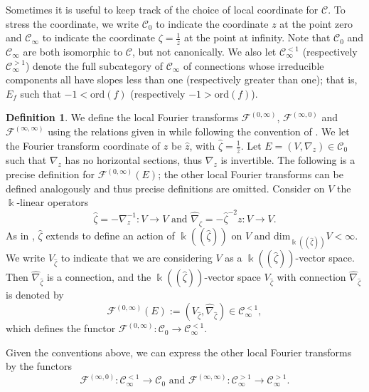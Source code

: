 \documentclass[11pt]{amsart}
\theoremstyle{plain}
\theoremstyle{definition}
\newtheorem{definition}[theorem]{Definition}
\theoremstyle{remark}
\def\z{\hat{\zeta}}
\begin{document}
 Sometimes it is useful to keep track of the choice of local coordinate for $\mathcal{C}$.  To stress the coordinate, we write $\mathcal{C}_0$ to indicate the coordinate $z$ at the point zero and $\mathcal{C}_{\infty}$ to indicate the coordinate $\zeta=\frac{1}{z}$ at the point at infinity.  Note that $\mathcal{C}_0$ and $\mathcal{C}_{\infty}$ are both isomorphic to $\mathcal{C}$, but not canonically.  We also let $\mathcal{C}_{\infty}^{<1}$ (respectively $\mathcal{C}_{\infty}^{>1}$) denote the full subcategory of $\mathcal{C}_{\infty}$ of connections whose irreducible components all have slopes less than one (respectively greater than one); that is, $E_f$ such that $-1< \text{ord}(f)$ (respectively $-1>\text{ord}(f)$).

\begin{definition}
We define the local Fourier transforms $\mathcal{F}^{(0,\infty)}$, $\mathcal{F}^{(\infty,0)}$ and $\mathcal{F}^{(\infty,\infty)}$ using the relations given in \cite[Propositions 3.7, 3.9 and 3.12]{bloch} while following the convention of \cite[Section 2.2]{dima}.  We let the Fourier transform coordinate of $z$ be $\hat{z}$, with $\z=\frac{1}{\hat{z}}$. Let $E=(V,\nabla_z)\in\mathcal{C}_0$ such that $\nabla_z$ has no horizontal sections, thus $\nabla_z$ is invertible.  The following is a precise definition for $\mathcal{F}^{(0,\infty)}(E)$; the other local Fourier transforms can be defined analogously and thus precise definitions are omitted.  Consider on $V$ the $\Bbbk$-linear operators
\begin{equation}\label{fourierdef}
	\z=-\nabla_z^{-1}\colon V\to V \text{ and } \hat{\nabla}_{\z}=-\z^{-2}z\colon V \to V.
\end{equation}
As in \cite{dima}, $\z$ extends to define an action of $\Bbbk((\z))$ on $V$ and dim$_{\Bbbk((\z))}V<\infty$. We write $V_{\z}$ to indicate that we are considering $V$ as a $\Bbbk((\z))$-vector space. Then $\hat{\nabla}_{\z}$ is a connection, and the $\Bbbk((\z))$-vector space $V_{\z}$ with connection $\hat{\nabla}_{\z}$ is denoted by
\[ \mathcal{F}^{(0,\infty)}(E):=(V_{\z},\hat{\nabla}_{\z})\in \mathcal{C}_{\infty}^{<1},\]
which defines the functor $\mathcal{F}^{(0,\infty)}\colon \mathcal{C}_0 \to \mathcal{C}_{\infty}^{<1}$.
\end{definition}

Given the conventions above, we can express the other local Fourier transforms by the functors
$$\mathcal{F}^{(\infty,0)}\colon \mathcal{C}_{\infty}^{<1} \to \mathcal{C}_0 \text{   and   }\mathcal{F}^{(\infty,\infty)}\colon \mathcal{C}_{\infty}^{>1}\to \mathcal{C}_{\infty}^{>1}.$$
\end{document}
